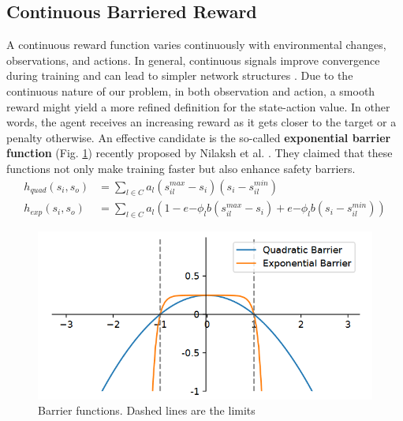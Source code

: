 \documentclass[../main.tex]{subfiles}
\begin{document}
\subsection{Continuous Barriered Reward}
A continuous reward function varies continuously with environmental changes, observations, and actions. In general, continuous signals improve convergence during training and can lead to simpler network structures \cite{MathWorksReward2021, rlbible_rewarddesign}. Due to the continuous nature of our problem, in both observation and action, a smooth reward might yield a more refined definition for the state-action value. In other words, the agent receives an increasing reward as it gets closer to the target or a penalty otherwise. An effective candidate is the so-called \textbf{exponential barrier function} (Fig. \ref{fig:barrier_fns}) recently proposed by Nilaksh et al. \cite{nilaksh2024barrier}. They claimed that these functions not only make training faster but also enhance safety barriers.
\begin{align}
    h_{quad}(s_i, s_o) &= \sum_{l \in C} a_l \left( s_{il}^{max} - s_i \right) \left( s_i - s_{il}^{min} \right) 
    \label{eq:quad_barrier} \\
    h_{exp}(s_i, s_o) &= \sum_{l \in C} a_l \left( 1 - e{-\phi_lb(s_{il}^{max}-s_i)} + e{-\phi_lb(s_i-s_{il}^{min})} \right)
    \label{eq:exp_barrier}
\end{align}
\begin{figure}[htbp]
    \centering
    \includegraphics[width=0.75\linewidth]{figures/barrier_fns.png}
    \caption{Barrier functions. Dashed lines are the limits}
    \label{fig:barrier_fns}
\end{figure}
\end{document}
